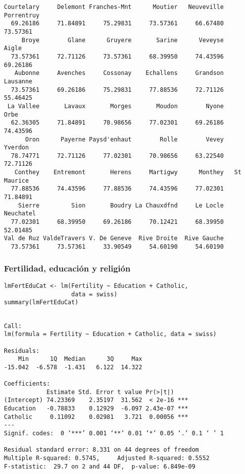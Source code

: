 \documentclass{beamer}
\begin{document}
\begin{frame}[fragile]
\begin{verbatim}
Courtelary     Delemont Franches-Mnt      Moutier   Neuveville   Porrentruy 
  69.26186     71.84891     75.29831     73.57361     66.67480     73.57361 
     Broye        Glane      Gruyere       Sarine      Veveyse        Aigle 
  73.57361     72.71126     73.57361     68.39950     74.43596     69.26186 
   Aubonne     Avenches     Cossonay    Echallens     Grandson     Lausanne 
  73.57361     69.26186     75.29831     77.88536     72.71126     55.46425 
 La Vallee       Lavaux       Morges       Moudon        Nyone         Orbe 
  62.36305     71.84891     70.98656     77.02301     69.26186     74.43596 
      Oron      Payerne Paysd'enhaut        Rolle        Vevey      Yverdon 
  78.74771     72.71126     77.02301     70.98656     63.22540     72.71126 
   Conthey    Entremont       Herens     Martigwy      Monthey   St Maurice 
  77.88536     74.43596     77.88536     74.43596     77.02301     71.84891 
    Sierre         Sion       Boudry La Chauxdfnd     Le Locle    Neuchatel 
  77.02301     68.39950     69.26186     70.12421     68.39950     52.01485 
Val de Ruz ValdeTravers V. De Geneve  Rive Droite  Rive Gauche 
  73.57361     73.57361     33.90549     54.60190     54.60190
\end{verbatim}
\end{frame}
\begin{frame}[fragile]
\frametitle{Fertilidad, educación y religión}
\label{sec-3-3}


\lstset{language=R}
\begin{lstlisting}
lmFertEduCat <- lm(Fertility ~ Education + Catholic,
                   data = swiss)
summary(lmFertEduCat)
\end{lstlisting}


\begin{verbatim}

Call:
lm(formula = Fertility ~ Education + Catholic, data = swiss)

Residuals:
    Min      1Q  Median      3Q     Max 
-15.042  -6.578  -1.431   6.122  14.322 

Coefficients:
            Estimate Std. Error t value Pr(>|t|)    
(Intercept) 74.23369    2.35197  31.562  < 2e-16 ***
Education   -0.78833    0.12929  -6.097 2.43e-07 ***
Catholic     0.11092    0.02981   3.721  0.00056 ***
---
Signif. codes:  0 ‘***’ 0.001 ‘**’ 0.01 ‘*’ 0.05 ‘.’ 0.1 ‘ ’ 1 

Residual standard error: 8.331 on 44 degrees of freedom
Multiple R-squared: 0.5745,     Adjusted R-squared: 0.5552 
F-statistic:  29.7 on 2 and 44 DF,  p-value: 6.849e-09
\end{verbatim}

   
\end{frame}
\end{document}
